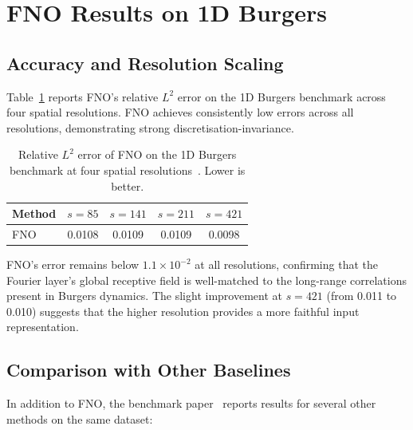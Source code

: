 \section{FNO Results on 1D Burgers}
\label{sec:fno:results}

\subsection{Accuracy and Resolution Scaling}

Table~\ref{tab:fno-results} reports FNO's relative $L^2$ error on the 1D Burgers benchmark across four spatial resolutions. FNO achieves consistently low errors across all resolutions, demonstrating strong discretisation-invariance.

\begin{table}[h!]
\centering
\begin{tabular}{lcccc}
\toprule
\textbf{Method} & $s=85$ & $s=141$ & $s=211$ & $s=421$ \\
\midrule
FNO~\cite{li2021fourier} & 0.0108 & 0.0109 & 0.0109 & 0.0098 \\
\bottomrule
\end{tabular}
\caption{Relative $L^2$ error of FNO on the 1D Burgers benchmark at four spatial resolutions~\cite{li2021fourier}. Lower is better.}
\label{tab:fno-results}
\end{table}

FNO's error remains below $1.1 \times 10^{-2}$ at all resolutions, confirming that the Fourier layer's global receptive field is well-matched to the long-range correlations present in Burgers dynamics. The slight improvement at $s=421$ (from 0.011 to 0.010) suggests that the higher resolution provides a more faithful input representation.

\subsection{Comparison with Other Baselines}

In addition to FNO, the benchmark paper~\cite{li2021fourier} reports results for several other methods on the same dataset:

